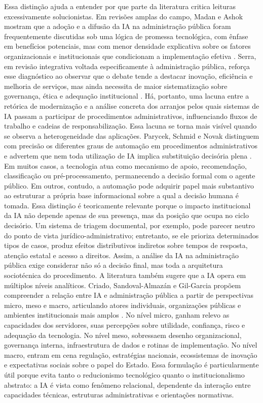 \documentclass[12pt,a4paper]{article}
\begin{document}
Essa distinção ajuda a entender por que parte da literatura critica leituras excessivamente solucionistas. Em revisões amplas do campo, Madan e Ashok mostram que a adoção e a difusão da IA na administração pública foram frequentemente discutidas sob uma lógica de promessa tecnológica, com ênfase em benefícios potenciais, mas com menor densidade explicativa sobre os fatores organizacionais e institucionais que condicionam a implementação efetiva \autocite{madan2022ai}. Serra, em revisão integrativa voltada especificamente à administração pública, reforça esse diagnóstico ao observar que o debate tende a destacar inovação, eficiência e melhoria de serviços, mas ainda necessita de maior sistematização sobre governança, ética e adequação institucional \autocite{serra2024a}. Há, portanto, uma lacuna entre a retórica de modernização e a análise concreta dos arranjos pelos quais sistemas de IA passam a participar de procedimentos administrativos, influenciando fluxos de trabalho e cadeias de responsabilização.
Essa lacuna se torna mais visível quando se observa a heterogeneidade das aplicações. Parycek, Schmid e Novak distinguem com precisão os diferentes graus de automação em procedimentos administrativos e advertem que nem toda utilização de IA implica substituição decisória plena \autocite{parycek2023artificial}. Em muitos casos, a tecnologia atua como mecanismo de apoio, recomendação, classificação ou pré-processamento, permanecendo a decisão formal com o agente público. Em outros, contudo, a automação pode adquirir papel mais substantivo ao estruturar a própria base informacional sobre a qual a decisão humana é tomada. Essa distinção é teoricamente relevante porque o impacto institucional da IA não depende apenas de sua presença, mas da posição que ocupa no ciclo decisório. Um sistema de triagem documental, por exemplo, pode parecer neutro do ponto de vista jurídico-administrativo; entretanto, se ele prioriza determinados tipos de casos, produz efeitos distributivos indiretos sobre tempos de resposta, atenção estatal e acesso a direitos. Assim, a análise da IA na administração pública exige considerar não só a decisão final, mas toda a arquitetura sociotécnica do procedimento.
A literatura também sugere que a IA opera em múltiplos níveis analíticos. Criado, Sandoval-Almazán e Gil-Garcia propõem compreender a relação entre IA e administração pública a partir de perspectivas micro, meso e macro, articulando atores individuais, organizações públicas e ambientes institucionais mais amplos \autocite{criado2024artificial}. No nível micro, ganham relevo as capacidades dos servidores, suas percepções sobre utilidade, confiança, risco e adequação da tecnologia. No nível meso, sobressaem desenho organizacional, governança interna, infraestrutura de dados e rotinas de implementação. No nível macro, entram em cena regulação, estratégias nacionais, ecossistemas de inovação e expectativas sociais sobre o papel do Estado. Essa formulação é particularmente útil porque evita tanto o reducionismo tecnológico quanto o institucionalismo abstrato: a IA é vista como fenômeno relacional, dependente da interação entre capacidades técnicas, estruturas administrativas e orientações normativas.
\end{document}
